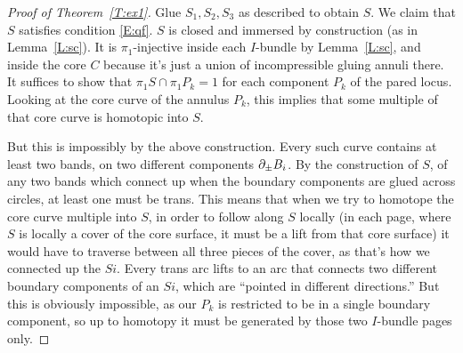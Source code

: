 \begin{proof}[Proof of Theorem~\ref{T:ex1}]
Glue $S_1,S_2,S_3$ as described to obtain $S$. We claim that $S$ satisfies
condition \eqref{E:qf}. $S$ is closed and immersed by construction (as in
Lemma~\ref{L:sc}). It is $\pi_1$-injective inside each $I$-bundle by
Lemma~\ref{L:sc}, and inside the core $C$ because it's just a union of
incompressible gluing annuli there. It suffices to show that $\pi_1S \cap
\pi_1P_k = 1$ for each component $P_k$ of the pared locus. Looking at the core
curve of the annulus $P_k$, this implies that some multiple of that core curve
is homotopic into $S$.

But this is impossibly by the above construction. Every such curve contains at
least two bands, on two different components $\partial_\pm B_i$. By the construction
of $S$, of any two bands which connect up when the boundary components are
glued across circles, at least one must be trans. This means that when we try
to homotope the core curve multiple into $S$, in order to follow along $S$
locally (in each page, where $S$ is locally a cover of the core surface, it
must be a lift from that core surface) it would have to traverse between all
three pieces of the cover, as that's how we connected up the $Si$. Every trans
arc lifts to an arc that connects two different boundary components of an $Si$,
which are ``pointed in different directions.'' But this is obviously
impossible, as our $P_k$ is restricted to be in a single boundary component, so
up to homotopy it must be generated by those two $I$-bundle pages only.

\end{proof}


